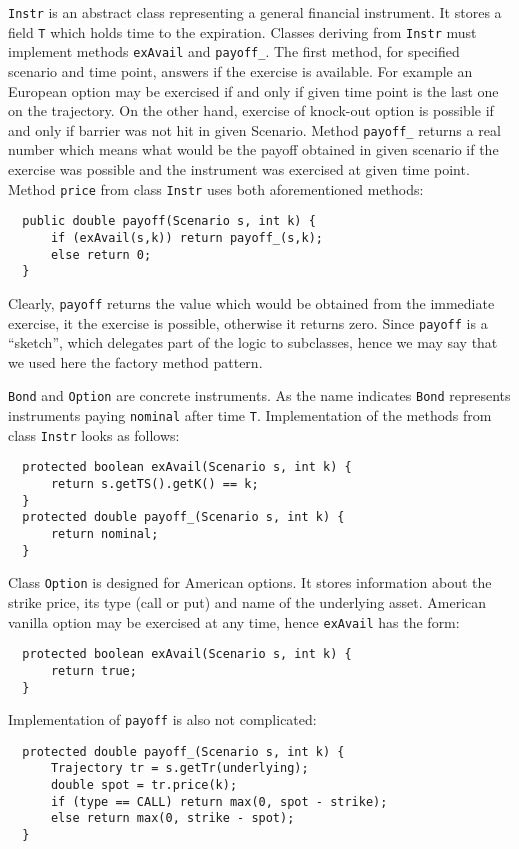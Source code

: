 \documentclass[a4paper,11pt, twoside]{book}
\theoremstyle{definition}
\theoremstyle{remark}
\newcounter{example}[chapter]
\begin{document}
\texttt{Instr} is an abstract class representing a general financial instrument. It stores a field \texttt{T} which holds time to the expiration. Classes deriving from \texttt{Instr} must implement methods \texttt{exAvail} and \texttt{payoff\_}. The first method, for specified scenario and time point, answers if the exercise is available. For example an European option may be exercised if and only if given time point is the last one on the trajectory. On the other hand, exercise of knock-out option is possible if and only if barrier was not hit in given Scenario. Method \texttt{payoff\_} returns a real number which means what would be the payoff obtained in given scenario if the exercise was possible and the instrument was exercised at given time point. Method \texttt{price} from class \texttt{Instr} uses both aforementioned methods:
\begin{lstlisting}
  public double payoff(Scenario s, int k) {
      if (exAvail(s,k)) return payoff_(s,k);
      else return 0;
  }
\end{lstlisting}
Clearly, \texttt{payoff} returns the value which would be obtained from the immediate exercise, it the exercise is possible, otherwise it returns zero. Since \texttt{payoff} is a ``sketch'', which delegates part of the logic to subclasses, hence we may say that we used here the factory method pattern. 

\texttt{Bond} and \texttt{Option} are concrete instruments. As the name indicates \texttt{Bond} represents instruments paying \texttt{nominal} after time \texttt{T}. Implementation of the methods from class \texttt{Instr} looks as follows: 
\begin{lstlisting}
  protected boolean exAvail(Scenario s, int k) {        
      return s.getTS().getK() == k;
  }
  protected double payoff_(Scenario s, int k) {
      return nominal;
  }
\end{lstlisting}

	
Class \texttt{Option} is designed for American options. It stores information about the strike price, its type (call or put) and name of the underlying asset. American vanilla option may be exercised at any time, hence \texttt{exAvail} has the form:
\begin{lstlisting}
  protected boolean exAvail(Scenario s, int k) {
      return true;
  }
\end{lstlisting}
Implementation of \texttt{payoff} is also not complicated:
\begin{lstlisting}
  protected double payoff_(Scenario s, int k) {
      Trajectory tr = s.getTr(underlying);
      double spot = tr.price(k);
      if (type == CALL) return max(0, spot - strike);
      else return max(0, strike - spot);
  }
\end{lstlisting}
\end{document}
